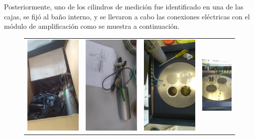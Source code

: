 	Posteriormente, uno de los cilindros de medición fue identificado en una de las cajas, se fijó al baño interno, y se llevaron a cabo las conexiones eléctricas con el módulo de amplificación como se muestra a continuación. 
	\begin{figure}[h]
		\centering
		\begin{tabular}{cccc}
			\includegraphics[width=0.24\linewidth]{Figures/process/box1} & 
			\includegraphics[width=0.24\linewidth]{Figures/process/holder} &
			\includegraphics[width=0.24\linewidth]{Figures/process/p1} & 
			\includegraphics[width=0.24\linewidth]{Figures/process/p2} \\

\end{tabular}
\end{figure}
